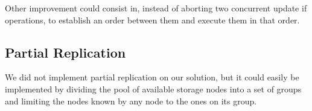 \documentclass[times, 10pt,twocolumn]{article}
\begin{document}
Other improvement could consist in, instead of aborting two concurrent update if operations, to establish an order between them and execute them in that order.

\subsection{Partial Replication}

We did not implement partial replication on our solution, but it could easily be implemented by dividing the pool of available storage nodes into a set of groups and limiting
the nodes known by any node to the ones on its group. 




\nocite{ex1,ex2}


\end{document}
